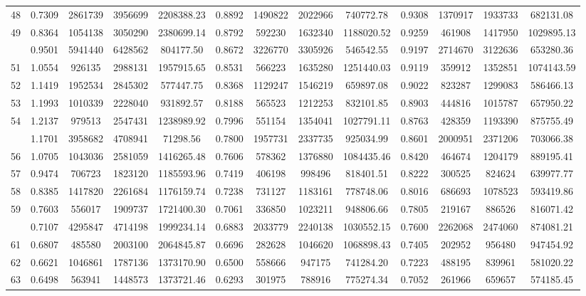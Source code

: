 \documentclass[
  12pt,
]{article}
\begin{document}
\begin{longtable}[t]{lcccccccccccc}
48 & 0.7309 & 2861739 & 3956699 & 2208388.23 & 0.8892 & 1490822 & 2022966 & 740772.78 & 0.9308 & 1370917 & 1933733 & 682131.08\\
49 & 0.8364 & 1054138 & 3050290 & 2380699.14 & 0.8792 & 592230 & 1632340 & 1188020.52 & 0.9259 & 461908 & 1417950 & 1029895.13\\
\addlinespace
50 & 0.9501 & 5941440 & 6428562 & 804177.50 & 0.8672 & 3226770 & 3305926 & 546542.55 & 0.9197 & 2714670 & 3122636 & 653280.36\\
51 & 1.0554 & 926135 & 2988131 & 1957915.65 & 0.8531 & 566223 & 1635280 & 1251440.03 & 0.9119 & 359912 & 1352851 & 1074143.59\\
52 & 1.1419 & 1952534 & 2845302 & 577447.75 & 0.8368 & 1129247 & 1546219 & 659897.08 & 0.9022 & 823287 & 1299083 & 586466.13\\
53 & 1.1993 & 1010339 & 2228040 & 931892.57 & 0.8188 & 565523 & 1212253 & 832101.85 & 0.8903 & 444816 & 1015787 & 657950.22\\
54 & 1.2137 & 979513 & 2547431 & 1238989.92 & 0.7996 & 551154 & 1354041 & 1027791.11 & 0.8763 & 428359 & 1193390 & 875755.49\\
\addlinespace
55 & 1.1701 & 3958682 & 4708941 & 71298.56 & 0.7800 & 1957731 & 2337735 & 925034.99 & 0.8601 & 2000951 & 2371206 & 703066.38\\
56 & 1.0705 & 1043036 & 2581059 & 1416265.48 & 0.7606 & 578362 & 1376880 & 1084435.46 & 0.8420 & 464674 & 1204179 & 889195.41\\
57 & 0.9474 & 706723 & 1823120 & 1185593.96 & 0.7419 & 406198 & 998496 & 818401.51 & 0.8222 & 300525 & 824624 & 639977.77\\
58 & 0.8385 & 1417820 & 2261684 & 1176159.74 & 0.7238 & 731127 & 1183161 & 778748.06 & 0.8016 & 686693 & 1078523 & 593419.86\\
59 & 0.7603 & 556017 & 1909737 & 1721400.30 & 0.7061 & 336850 & 1023211 & 948806.66 & 0.7805 & 219167 & 886526 & 816071.42\\
\addlinespace
60 & 0.7107 & 4295847 & 4714198 & 1999234.14 & 0.6883 & 2033779 & 2240138 & 1030552.15 & 0.7600 & 2262068 & 2474060 & 874081.21\\
61 & 0.6807 & 485580 & 2003100 & 2064845.87 & 0.6696 & 282628 & 1046620 & 1068898.43 & 0.7405 & 202952 & 956480 & 947454.92\\
62 & 0.6621 & 1046861 & 1787136 & 1373170.90 & 0.6500 & 558666 & 947175 & 741284.20 & 0.7223 & 488195 & 839961 & 581020.22\\
63 & 0.6498 & 563941 & 1448573 & 1373721.46 & 0.6293 & 301975 & 788916 & 775274.34 & 0.7052 & 261966 & 659657 & 574185.45\\

\end{longtable}
\end{document}
